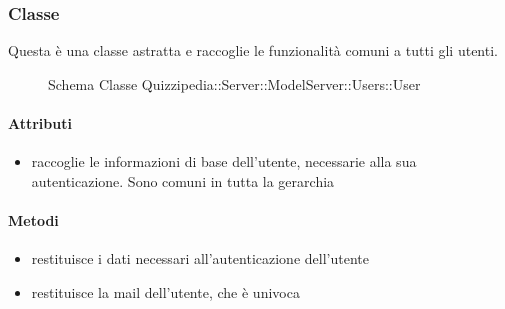 \subsubsection{Classe }
Questa è una classe astratta e raccoglie le funzionalità comuni a tutti gli utenti.
\begin{figure}[H]
\centering
\noindent{}
\caption[Schema Classe User]{Schema Classe Quizzipedia::Server::ModelServer::Users::User}
\end{figure}
\paragraph{Attributi}
\begin{itemize}
\item {}
\newline
raccoglie le informazioni di base dell'utente, necessarie alla sua autenticazione. Sono comuni in tutta la gerarchia
\end{itemize}
\paragraph{Metodi}
\begin{itemize}
\item {}
\newline
restituisce i dati necessari all'autenticazione dell'utente
\newline
\item {}
\newline
restituisce la mail dell'utente, che è univoca
\newline
\end{itemize}
